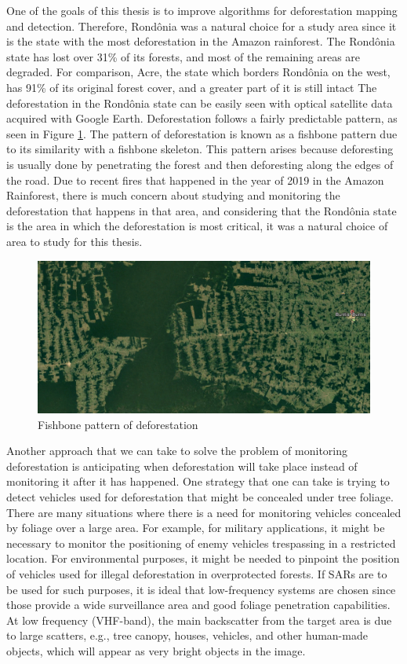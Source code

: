 One of the goals of this thesis is to improve algorithms for deforestation mapping and detection. Therefore, Rondônia was a natural choice for a study area since it is the state with the most deforestation in the Amazon rainforest. The Rondônia state has lost over 31\% of its forests, and most of the remaining areas are degraded. For comparison, Acre, the state which borders Rondônia on the west, has 91\% of its original forest cover, and a greater part of it is still intact \cite{rondoniaDeforestation} The deforestation in the Rondônia state can be easily seen with optical satellite data acquired with Google Earth. Deforestation follows a fairly predictable pattern, as seen in Figure \ref{fig:fishbone}. The pattern of deforestation is known as a fishbone pattern due to its similarity with a fishbone skeleton. This pattern arises because deforesting is usually done by penetrating the forest and then deforesting along the edges of the road.  Due to recent fires that happened in the year of 2019 in the Amazon Rainforest, there
is much concern about studying and monitoring the deforestation that happens in that
area, and considering that the Rondônia state is the area in which the deforestation is
most critical, it was a natural choice of area to study for this thesis.

\begin{figure}[H]
    \centering
    \includegraphics[width=\linewidth]{Cap2-Methods/fishbone.png}
    \caption{Fishbone pattern of deforestation}
    \label{fig:fishbone}
\end{figure}


Another approach that we can take to solve the problem of monitoring deforestation is anticipating when deforestation will take place instead of monitoring it after it has happened. One strategy that one can take is trying to detect vehicles used for deforestation that might be concealed under tree foliage. There are many situations where there is a need for monitoring vehicles concealed by foliage over a large area. For example, for military applications, it might be necessary to monitor the positioning of enemy vehicles trespassing in a restricted location. For environmental purposes, it might be needed to pinpoint the position of vehicles used for illegal deforestation in overprotected forests. If SARs are to be used for such purposes, it is ideal that low-frequency systems are chosen since those provide a wide surveillance area and good foliage penetration capabilities. At low frequency (VHF-band), the main backscatter from the target area is due to large scatters, e.g., tree canopy, houses, vehicles, and other human-made objects, which will appear as very bright objects in the image.

